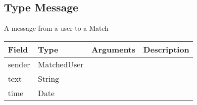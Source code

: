 \hypertarget{type-message}{%
\subsection{Type Message}\label{type-message}}

A message from a user to a Match

\begin{longtable}[]{@{}llll@{}}
\toprule
Field & Type & Arguments & Description\tabularnewline
\midrule
\endhead
sender & MatchedUser & &\tabularnewline
text & String & &\tabularnewline
time & Date & &\tabularnewline
\bottomrule
\end{longtable}
